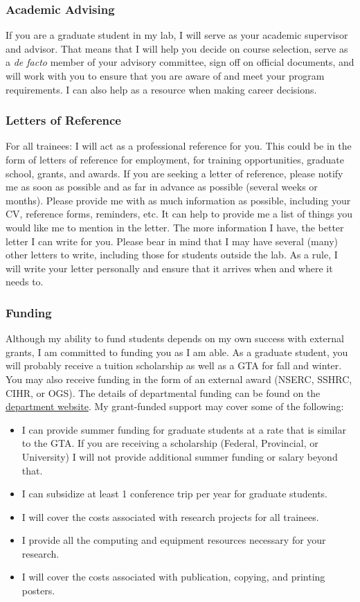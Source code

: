 \documentclass{article}
\begin{document}
\subsubsection{Academic Advising} 
If you are a graduate student in my lab, I will serve as your academic supervisor and advisor. That means that I will help you decide on course selection, serve as a \textit{de facto} member of your advisory committee, sign off on official documents, and will work with you to ensure that you are aware of and meet your program requirements. I can also help as a resource when making career decisions. 

\subsubsection {Letters of Reference} 
For all trainees: I will act as a professional reference for you. This could be in the form of letters of reference for employment, for training opportunities, graduate school, grants, and awards. If you are seeking a letter of reference, please notify me as soon as possible and as far in advance as possible (several weeks or months). Please provide me with as much information as possible, including your CV, reference forms, reminders, etc. It can help to provide me a list of things you would like me to mention in the letter. The more information I have, the better letter I can write for you. Please bear in mind that I may have several (many) other letters to write, including those for students outside the lab. As a rule, I will write your letter personally and ensure that it arrives when and where it needs to.

\subsubsection{Funding} 
Although my ability to fund students depends on my own success with external grants, I am committed to funding you as I am able. As a graduate student, you will probably receive a tuition scholarship as well as a GTA for fall and winter. You may also receive funding in the form of an external award (NSERC, SSHRC, CIHR, or OGS). The details of departmental funding can be found on the \href{http://psychology.uwo.ca/graduate/index.html}{department website}. My grant-funded support may cover some of the following:

\begin{itemize}
\item I can provide summer funding for graduate students at a rate that is similar to the GTA. If you are receiving a scholarship (Federal, Provincial, or University) I will not provide additional summer funding or salary beyond that.
\item I can subsidize at least 1 conference trip per year for graduate students. 
\item I will cover the costs associated with research projects for all trainees. 
\item I provide all the computing and equipment resources necessary for your research.
\item I will cover the costs associated with publication, copying, and printing posters.
\end{itemize}
\end{document}
